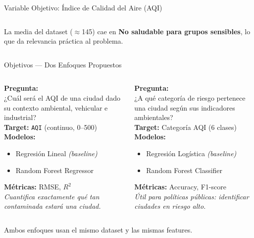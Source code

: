 \documentclass[aspectratio=169]{beamer}
\begin{document}
\begin{frame}{Variable Objetivo: Índice de Calidad del Aire (AQI)}
\begin{columns}[T]
\vspace{0.15cm}
\begin{tcolorbox}[colback=uaemcolor!5, colframe=uaemcolor!40]
\footnotesize\centering
La media del dataset ($\approx$145) cae en \textbf{No saludable para grupos sensibles}, lo que da relevancia práctica al problema.
\end{tcolorbox}
\end{columns}
\end{frame}

\begin{frame}{Objetivos — Dos Enfoques Propuestos}
\begin{columns}[T]
\vspace{-0.5cm}
\begin{tcolorbox}[colback=uaemcolor!5, colframe=uaemcolor!70, title={\textbf{Opción A — Regresión}}]
\small
\textbf{Pregunta:}\\
¿Cuál será el AQI de una ciudad dado su contexto ambiental, vehicular e industrial?\\[5pt]
\textbf{Target:} \texttt{AQI} (continuo, 0--500)\\[5pt]
\textbf{Modelos:}
\begin{itemize}\small
    \item Regresión Lineal \textit{(baseline)}
    \item Random Forest Regressor
\end{itemize}
\textbf{Métricas:} RMSE, $R^2$\\[3pt]
\footnotesize\textit{Cuantifica exactamente qué tan contaminada estará una ciudad.}
\end{tcolorbox}

\vspace{-0.5cm}
\begin{tcolorbox}[colback=verdeenv!5, colframe=verdeenv!70, title={\textbf{Opción B — Clasificación}}]
\small
\textbf{Pregunta:}\\
¿A qué categoría de riesgo pertenece una ciudad según sus indicadores ambientales?\\[5pt]
\textbf{Target:} Categoría AQI (6 clases)\\[5pt]
\textbf{Modelos:}
\begin{itemize}\small
    \item Regresión Logística \textit{(baseline)}
    \item Random Forest Classifier
\end{itemize}
\textbf{Métricas:} Accuracy, F1-score\\[3pt]
\footnotesize\textit{Útil para políticas públicas: identificar ciudades en riesgo alto.}
\end{tcolorbox}
\end{columns}

\vspace{0.2cm}
\centering\footnotesize{Ambos enfoques usan el mismo dataset y las mismas features.}

\end{frame}
\end{document}
